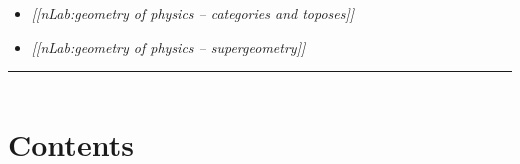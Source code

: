 \documentclass[12pt,titlepage]{article}
\theoremstyle{plain}
\theoremstyle{definition}
\theoremstyle{remark}
\begin{document}
\begin{itemize}%
\item \emph{[[nLab:geometry of physics -- categories and toposes]]}


\item \emph{[[nLab:geometry of physics -- supergeometry]]}



\end{itemize}

\vspace{.5em} \hrule \vspace{.5em}
$\,$


\hypertarget{contents}{}\section*{{Contents}}\label{contents}
\end{document}
